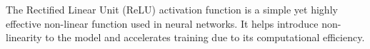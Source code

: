 The Rectified Linear Unit (ReLU) activation function is a simple yet highly effective non-linear function used in neural networks. It helps introduce non-linearity to the model and accelerates training due to its computational efficiency.